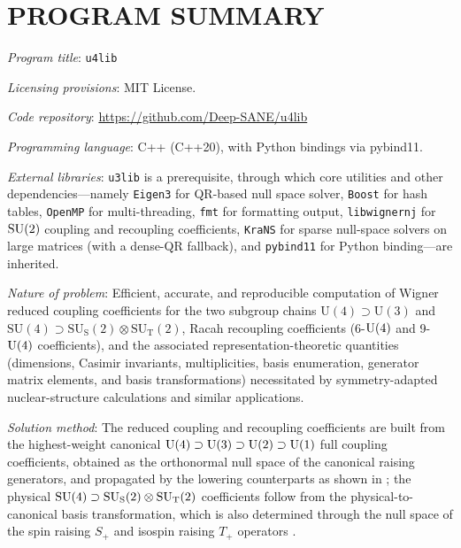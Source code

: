 \documentclass[aps,onecolumn,10pt,superscriptaddress,floatfix,nofootinbib]{revtex4}
\begin{document}

\maketitle

\section*{PROGRAM SUMMARY}
\noindent
\textit{Program title}: \texttt{u4lib}

\noindent
\textit{Licensing provisions}: MIT License.

\noindent
\textit{Code repository}: \url{https://github.com/Deep-SANE/u4lib}

\noindent
\textit{Programming language}: C++ (C++20), with Python bindings via pybind11.

\noindent
\textit{External libraries}: \texttt{u3lib} is a prerequisite, through which core utilities and other dependencies---namely 
\texttt{Eigen3} for QR-based null space solver, \texttt{Boost} for hash tables, 
\texttt{OpenMP} for multi-threading, \texttt{fmt} for formatting output, \texttt{libwignernj} for $\rm SU(2)$
coupling and recoupling coefficients, \texttt{KraNS} for sparse null-space solvers on large matrices (with a dense-QR fallback), 
and \texttt{pybind11} for Python binding---are inherited.

\noindent
\textit{Nature of problem}: Efficient, accurate, and reproducible computation of 
Wigner reduced coupling coefficients for the two subgroup chains
$\mathrm{U(4)}\supset\mathrm{U(3)}$ and
$\mathrm{SU(4)}\supset\mathrm{SU_S(2)}\otimes\mathrm{SU_T(2)}$, 
Racah recoupling coefficients (6-$\rm U(4)$ and 9-$\rm U(4)$ coefficients), 
and the associated representation-theoretic quantities
(dimensions, Casimir invariants, multiplicities, basis enumeration, generator matrix
elements, and basis transformations) necessitated by symmetry-adapted
nuclear-structure calculations and similar applications.

\noindent
\textit{Solution method}: The reduced coupling and recoupling coefficients are built from
the highest-weight canonical $\rm U(4) \supset U(3) \supset U(2) \supset U(1)$ full coupling coefficients, 
obtained as the orthonormal null space of the canonical raising generators, and
propagated by the lowering counterparts as shown in \cite{Dang2024EPJP2}; the physical
$\rm SU(4) \supset \mathrm{SU_S(2)}\otimes\mathrm{SU_T(2)}$ coefficients follow from the
physical-to-canonical basis transformation, which is also determined through the null space of the
spin raising $S_+$ and isospin raising $T_+$ operators \cite{Dang2024EPJP2}.
\end{document}
